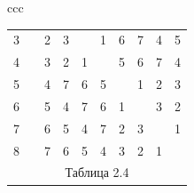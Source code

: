 \begin{center}
\begin{tabular}{ccc}
\begin{tabular}{cccccccccc}
3 & \vline & 2 & 3 & \ & 1 & 6 & 7 & 4 & 5 \\


4 & \vline & 3 & 2 & 1 & \ & 5 & 6 & 7 & 4 \\


5 & \vline & 4 & 7 & 6 & 5 & \ & 1 & 2 & 3 \\


6 & \vline & 5 & 4 & 7 & 6 & 1 & \ & 3 & 2 \\


7 & \vline & 6 & 5 & 4 & 7 & 2 & 3 & \ & 1 \\


8 & \vline & 7 & 6 & 5 & 4 & 3 & 2 & 1 & \ \\


\multicolumn{10}{c}{ Таблица 2.4}


\end{tabular}





\end{tabular}


\end{center}


\smallskip










